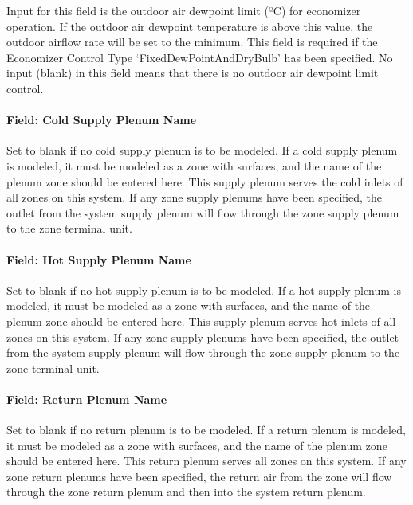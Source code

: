 Input for this field is the outdoor air dewpoint limit (ºC) for economizer operation. If the outdoor air dewpoint temperature is above this value, the outdoor airflow rate will be set to the minimum. This field is required if the Economizer Control Type `FixedDewPointAndDryBulb' has been specified. No input (blank) in this field means that there is no outdoor air dewpoint limit control.

\paragraph{Field: Cold Supply Plenum Name}\label{field-cold-supply-plenum-name-1}

Set to blank if no cold supply plenum is to be modeled. If a cold supply plenum is modeled, it must be modeled as a zone with surfaces, and the name of the plenum zone should be entered here. This supply plenum serves the cold inlets of all zones on this system. If any zone supply plenums have been specified, the outlet from the system supply plenum will flow through the zone supply plenum to the zone terminal unit.

\paragraph{Field: Hot Supply Plenum Name}\label{field-hot-supply-plenum-name-1}

Set to blank if no hot supply plenum is to be modeled. If a hot supply plenum is modeled, it must be modeled as a zone with surfaces, and the name of the plenum zone should be entered here. This supply plenum serves hot inlets of all zones on this system. If any zone supply plenums have been specified, the outlet from the system supply plenum will flow through the zone supply plenum to the zone terminal unit.

\paragraph{Field: Return Plenum Name}\label{field-return-plenum-name-12}

Set to blank if no return plenum is to be modeled. If a return plenum is modeled, it must be modeled as a zone with surfaces, and the name of the plenum zone should be entered here. This return plenum serves all zones on this system. If any zone return plenums have been specified, the return air from the zone will flow through the zone return plenum and then into the system return plenum.

